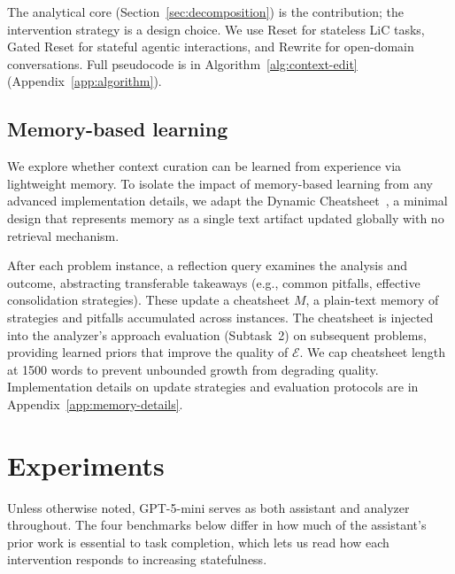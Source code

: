 \documentclass{article}
\begin{document}
The analytical core (Section~\ref{sec:decomposition}) is the contribution; the intervention strategy is a design choice. We use Reset for stateless LiC tasks, Gated Reset for stateful agentic interactions, and Rewrite for open-domain conversations. Full pseudocode is in Algorithm~\ref{alg:context-edit} (Appendix~\ref{app:algorithm}).

\subsection{Memory-based learning}
\label{sec:memory}

We explore whether context curation can be learned from experience via lightweight memory. 
To isolate the impact of memory-based learning from any advanced implementation details, we adapt the Dynamic Cheatsheet~\citep{suzgun2025cheatsheet}, a minimal design that represents memory as a single text artifact updated globally with no retrieval mechanism.

After each problem instance, a reflection query examines the analysis and outcome, abstracting transferable takeaways (e.g., common pitfalls, effective consolidation strategies). These update a cheatsheet $M$, a plain-text memory of strategies and pitfalls accumulated across instances. The cheatsheet is injected into the analyzer's approach evaluation (Subtask~2) on subsequent problems, providing learned priors that improve the quality of $\mathcal{E}$. We cap cheatsheet length at 1500 words to prevent unbounded growth from degrading quality. Implementation details on update strategies and evaluation protocols are in Appendix~\ref{app:memory-details}.


\section{Experiments}
\label{sec:experiments}

Unless otherwise noted, GPT-5-mini serves as both assistant and analyzer throughout. The four benchmarks below differ in how much of the assistant's prior work is essential to task completion, which lets us read how each intervention responds to increasing statefulness.
\end{document}
